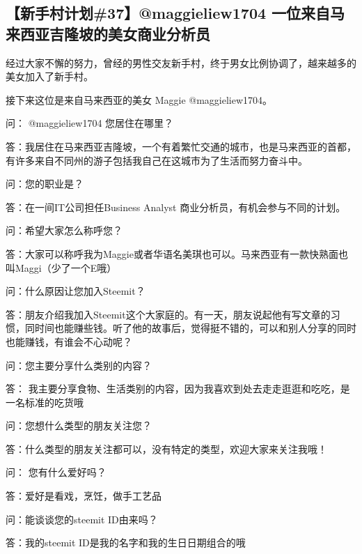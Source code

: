 \documentclass[]{ctexbook}
\begin{document}
\hypertarget{37maggieliew1704-}{%
\subsection{【新手村计划\#37】@maggieliew1704 一位来自马来西亚吉隆坡的美女商业分析员}\label{37maggieliew1704-}}

经过大家不懈的努力，曾经的男性交友新手村，终于男女比例协调了，越来越多的美女加入了新手村。

接下来这位是来自马来西亚的美女 Maggie @maggieliew1704。

问： @maggieliew1704 您居住在哪里？

答：我居住在马来西亚吉隆坡，一个有着繁忙交通的城市，也是马来西亚的首都，有许多来自不同州的游子包括我自己在这城市为了生活而努力奋斗中。

问：您的职业是？

答：在一间IT公司担任Business Analyst 商业分析员，有机会参与不同的计划。

问：希望大家怎么称呼您？

答：大家可以称呼我为Maggie或者华语名美琪也可以。马来西亚有一款快熟面也叫Maggi（少了一个E哦）

问：什么原因让您加入Steemit？

答：朋友介绍我加入Steemit这个大家庭的。有一天，朋友说起他有写文章的习惯，同时间也能赚些钱。听了他的故事后，觉得挺不错的，可以和别人分享的同时也能赚钱，有谁会不心动呢？

问：您主要分享什么类别的内容？

答： 我主要分享食物、生活类别的内容，因为我喜欢到处去走走逛逛和吃吃，是一名标准的吃货哦

问：您想什么类型的朋友关注您？

答：什么类型的朋友关注都可以，没有特定的类型，欢迎大家来关注我哦！

问： 您有什么爱好吗？

答：爱好是看戏，烹饪，做手工艺品

问：能谈谈您的steemit ID由来吗？

答：我的steemit ID是我的名字和我的生日日期组合的哦
\end{document}
